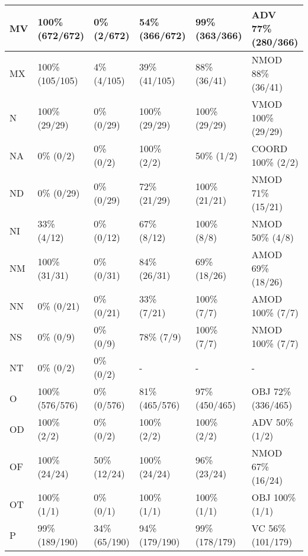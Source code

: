 \begin{figure*}
\begin{tabular}{|l|l|l|l|l|l|}
\hline
MV & 100\% (672/672) & 0\% (2/672) & 54\% (366/672) & 99\% (363/366) & ADV 77\% (280/366) \\ 
\hline
MX & 100\% (105/105) & 4\% (4/105) & 39\% (41/105) & 88\% (36/41) & NMOD 88\% (36/41) \\ 
\hline
N & 100\% (29/29) & 0\% (0/29) & 100\% (29/29) & 100\% (29/29) & VMOD 100\% (29/29) \\ 
\hline
NA & 0\% (0/2) & 0\% (0/2) & 100\% (2/2) & 50\% (1/2) & COORD 100\% (2/2) \\ 
\hline
ND & 0\% (0/29) & 0\% (0/29) & 72\% (21/29) & 100\% (21/21) & NMOD 71\% (15/21) \\ 
\hline
NI & 33\% (4/12) & 0\% (0/12) & 67\% (8/12) & 100\% (8/8) & NMOD 50\% (4/8) \\ 
\hline
NM & 100\% (31/31) & 0\% (0/31) & 84\% (26/31) & 69\% (18/26) & AMOD 69\% (18/26) \\ 
\hline
NN & 0\% (0/21) & 0\% (0/21) & 33\% (7/21) & 100\% (7/7) & AMOD 100\% (7/7) \\ 
\hline
NS & 0\% (0/9) & 0\% (0/9) & 78\% (7/9) & 100\% (7/7) & NMOD 100\% (7/7) \\ 
\hline
NT & 0\% (0/2) & 0\% (0/2) & - & - & - \\ 
\hline
O & 100\% (576/576) & 0\% (0/576) & 81\% (465/576) & 97\% (450/465) & OBJ 72\% (336/465) \\ 
\hline
OD & 100\% (2/2) & 0\% (0/2) & 100\% (2/2) & 100\% (2/2) & ADV 50\% (1/2) \\ 
\hline
OF & 100\% (24/24) & 50\% (12/24) & 100\% (24/24) & 96\% (23/24) & NMOD 67\% (16/24) \\ 
\hline
OT & 100\% (1/1) & 0\% (0/1) & 100\% (1/1) & 100\% (1/1) & OBJ 100\% (1/1) \\ 
\hline
P & 99\% (189/190) & 34\% (65/190) & 94\% (179/190) & 99\% (178/179) & VC 56\% (101/179) \\ 
\hline
\end{tabular}
\end{figure*}

